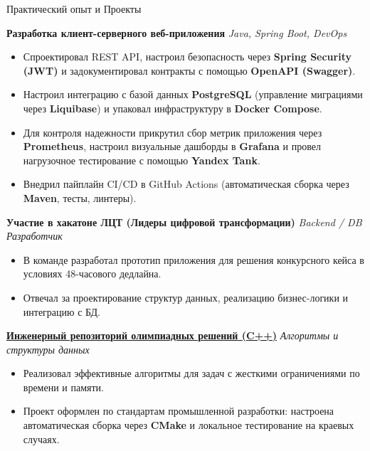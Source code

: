 \documentclass{resume} %
\begin{document}
\begin{rSection}{Практический опыт и Проекты}

\item \textbf{Разработка клиент-серверного веб-приложения} \hfill \textit{Java, Spring Boot, DevOps}
\begin{itemize}
    \itemsep -3pt {}
    \item Спроектировал REST API, настроил безопасность через \textbf{Spring Security (JWT)} и задокументировал контракты с помощью \textbf{OpenAPI (Swagger)}.
    \item Настроил интеграцию с базой данных \textbf{PostgreSQL} (управление миграциями через \textbf{Liquibase}) и упаковал инфраструктуру в \textbf{Docker Compose}.
    \item Для контроля надежности прикрутил сбор метрик приложения через \textbf{Prometheus}, настроил визуальные дашборды в \textbf{Grafana} и провел нагрузочное тестирование с помощью \textbf{Yandex Tank}.
    \item Внедрил пайплайн CI/CD в GitHub Actions (автоматическая сборка через \textbf{Maven}, тесты, линтеры).
\end{itemize}

\item \textbf{Участие в хакатоне ЛЦТ (Лидеры цифровой трансформации)} \hfill \textit{Backend / DB Разработчик}
\begin{itemize}
    \itemsep -3pt {}
    \item В команде разработал прототип приложения для решения конкурсного кейса в условиях 48-часового дедлайна.
    \item Отвечал за проектирование структур данных, реализацию бизнес-логики и интеграцию с БД.
\end{itemize}

\item \textbf{\href{https://github.com/Antichnoste/OlProga}{Инженерный репозиторий олимпиадных решений (C++)}} \hfill \textit{Алгоритмы и структуры данных}
\begin{itemize}
    \itemsep -3pt {}
    \item Реализовал эффективные алгоритмы для задач с жесткими ограничениями по времени и памяти. 
    \item Проект оформлен по стандартам промышленной разработки: настроена автоматическая сборка через \textbf{CMake} и локальное тестирование на краевых случаях.
\end{itemize}

\end{rSection} 
\end{document}
